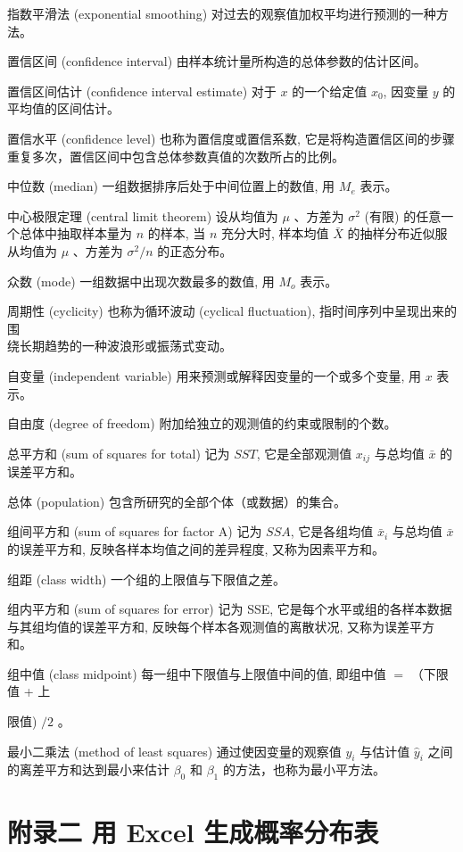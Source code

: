 \documentclass[10pt]{article}
\begin{document}
\begin{CJK*}{UTF8}{bsmi}
指数平滑法 (exponential smoothing) 对过去的观察值加权平均进行预测的一种方法。

置信区间 (confidence interval) 由样本统计量所构造的总体参数的估计区间。

置信区间估计 (confidence interval estimate) 对于 $x$ 的一个给定值 $x_{0}$, 因变量 $y$ 的平均值的区间估计。

置信水平 (confidence level) 也称为置信度或置信系数, 它是将构造置信区间的步骤重复多次，置信区间中包含总体参数真值的次数所占的比例。

中位数 (median) 一组数据排序后处于中间位置上的数值, 用 $M_{e}$ 表示。

中心极限定理 (central limit theorem) 设从均值为 $\mu$ 、方差为 $\sigma^{2}$ (有限) 的任意一个总体中抽取样本量为 $n$ 的样本, 当 $n$ 充分大时, 样本均值 $\bar{X}$ 的抽样分布近似服从均值为 $\mu$ 、方差为 $\sigma^{2} / n$ 的正态分布。

众数 (mode) 一组数据中出现次数最多的数值, 用 $M_{o}$ 表示。

周期性 (cyclicity) 也称为循环波动 (cyclical fluctuation), 指时间序列中呈现出来的围\\
绕长期趋势的一种波浪形或振荡式变动。

自变量 (independent variable) 用来预测或解释因变量的一个或多个变量, 用 $x$ 表示。

自由度 (degree of freedom) 附加给独立的观测值的约束或限制的个数。

总平方和 (sum of squares for total) 记为 $S S T$, 它是全部观测值 $x_{i j}$ 与总均值 $\bar{x}$ 的误差平方和。

总体 (population) 包含所研究的全部个体（或数据）的集合。

组间平方和 (sum of squares for factor A) 记为 $S S A$, 它是各组均值 $\bar{x}_{i}$ 与总均值 $\bar{x}$ 的误差平方和, 反映各样本均值之间的差异程度, 又称为因素平方和。

组距 (class width) 一个组的上限值与下限值之差。

组内平方和 (sum of squares for error) 记为 SSE, 它是每个水平或组的各样本数据与其组均值的误差平方和, 反映每个样本各观测值的离散状况, 又称为误差平方和。

组中值 (class midpoint) 每一组中下限值与上限值中间的值, 即组中值 $=$ （下限值 + 上

限值) $/ 2$ 。

最小二乘法 (method of least squares) 通过使因变量的观察值 $y_{i}$ 与估计值 $\hat{y}_{i}$ 之间的离差平方和达到最小来估计 $\beta_{0}$ 和 $\beta_{1}$ 的方法，也称为最小平方法。

\section*{附录二 用 Excel 生成概率分布表 }

\end{CJK*}
\end{document}
